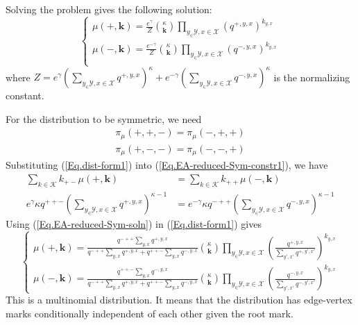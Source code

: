 \documentclass[12pt]{article}
\numberwithin{equation}{section}
\begin{document}
Solving the problem gives the following solution:
\begin{equation}
    \begin{cases}
        \mu(+, \mathbf{k}) = \displaystyle{\frac{e^\gamma}{Z}{\kappa\choose\mathbf{k}} \prod_{y_\in\mathcal{Y}, x\in\mathcal{X}}\left(q^{+,y,x}\right)^{k_{y,x}}}    \\
        \mu(-, \mathbf{k}) = \displaystyle{\frac{e^{-\gamma}}{Z}{\kappa\choose\mathbf{k}} \prod_{y_\in\mathcal{Y}, x\in\mathcal{X}}\left(q^{-,y,x}\right)^{k_{y,x}}} \\
    \end{cases}
    \label{Eq.dist-form1}
\end{equation}
where $Z = e^\gamma\left(\sum_{y_\in\mathcal{Y}, x\in\mathcal{X}}q^{+,y,x}\right)^\kappa + e^{-\gamma}\left(\sum_{y_\in\mathcal{Y}, x\in\mathcal{X}}q^{-,y,x}\right)^\kappa$ is the normalizing constant.

For the distribution to be symmetric, we need
\begin{align}
    \pi_\mu(+, +, -) = \pi_\mu(-, +, +) \label{Eq.EA-reduced-Sym-constr1} \\
    \pi_\mu(+, -, -) = \pi_\mu(-, -, +) \label{Eq.EA-reduced-Sym-constr2}
\end{align}
Substituting (\ref{Eq.dist-form1}) into (\ref{Eq.EA-reduced-Sym-constr1}), we have
\begin{align}
    \sum_{k\in\mathcal{K}}k_{+-}\mu(+, \mathbf{k})                                                       & = \sum_{k\in\mathcal{K}}k_{++}\mu(-, \mathbf{k})                                                         \nonumber                       \\
    e^\gamma\kappa q^{++-} \left(\sum_{{y_\in\mathcal{Y}, x\in\mathcal{X}}}q^{+, y, x}\right)^{\kappa-1} & = e^{-\gamma}\kappa q^{-++} \left(\sum_{{y_\in\mathcal{Y}, x\in\mathcal{X}}}q^{-, y, x}\right)^{\kappa-1} \label{Eq.EA-reduced-Sym-soln}
\end{align}
Using (\ref{Eq.EA-reduced-Sym-soln}) in (\ref{Eq.dist-form1}) gives
\begin{equation}
    \begin{cases}
        \mu(+, \mathbf{k}) = \displaystyle{\frac{q^{-++}\sum_{y, x}q^{+,y,x}}{q^{-++}\sum_{y, x}q^{+,y,x} + q^{++-}\sum_{y, x}q^{-,y,x}}{\kappa\choose\mathbf{k}} \prod_{y_\in\mathcal{Y}, x\in\mathcal{X}}\left(\frac{q^{+,y,x}}{\sum_{y', x'}q^{+,y',x'}}\right)^{k_{y,x}}} \\
        \mu(-, \mathbf{k}) = \displaystyle{\frac{q^{++-}\sum_{y, x}q^{-,y,x}}{q^{-++}\sum_{y, x}q^{+,y,x} + q^{++-}\sum_{y, x}q^{-,y,x}}{\kappa\choose\mathbf{k}} \prod_{y_\in\mathcal{Y}, x\in\mathcal{X}}\left(\frac{q^{-,y,x}}{\sum_{y', x'}q^{-,y',x'}}\right)^{k_{y,x}}}
    \end{cases}
    \label{Eq.dist-form2}
\end{equation}
This is a multinomial distribution. It means that the distribution has edge-vertex marks conditionally independent of each other given the root mark.
\end{document}
